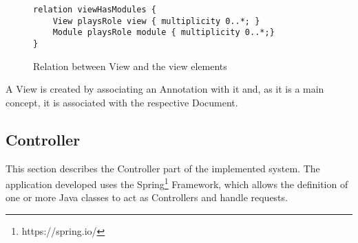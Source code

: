 \documentclass[conference]{IEEEtran}
\begin{document}
\begin{figure}
\lstset{style=customjava}
\begin{lstlisting}
relation viewHasModules {
	View playsRole view { multiplicity 0..*; }
	Module playsRole module { multiplicity 0..*;}
}
\end{lstlisting}
\caption{Relation between View and the view elements}
\label{figure:modelviewelements}
\end{figure}

A View is created by associating an Annotation with it and, as it is a main concept, it is associated with the respective Document.

\subsection{Controller}

This section describes the Controller part of the implemented system. The application developed uses the Spring\footnote{https://spring.io/} Framework, which allows the definition of one or more Java classes to act as Controllers and handle requests.
\end{document}
